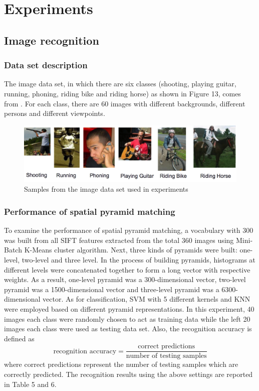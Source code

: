 \section{Experiments}
\subsection{Image recognition}
\subsubsection{Data set description}
The image data set, in which there are six classes (shooting, playing guitar, running, phoning, riding bike and riding horse) as shown in Figure 13, comes from \cite{li2011actions}. For each class, there are 60 images with different backgrounds, different persons and different viewpoints. 

\begin{figure}[!ht]
\centering
  \includegraphics[width=1\textwidth]{./imageSet.png}
\caption{Samples from the image data set used in experiments \cite{li2011actions}}
\end{figure}

\subsubsection{Performance of spatial pyramid matching}
To examine the performance of spatial pyramid matching, a vocabulary with 300 was built from all SIFT features extracted from the total 360 images using Mini-Batch K-Means cluster algorithm. Next, three kinds of pyramids were built: one-level, two-level and three level. In the process of building pyramids, histograms at different levels were concatenated together to form a long vector with respective weights. As a result, one-level pyramid was a 300-dimensional vector, two-level pyramid was a 1500-dimensional vector and three-level pyramid was a 6300-dimensional vector. As for classification, SVM with 5 different kernels and KNN were employed based on different pyramid representations. In this experiment, 40 images each class were randomly chosen to act as training data while the left 20 images each class were used as testing data set. Also, the recognition accuracy is defined as 
\begin{equation}
\text{recognition accuracy} = \frac{\text{correct predictions}}{\text{number of testing samples}}
\end{equation}
where correct predictions represent the number of testing samples which are correctly predicted. The recognition results using the above settings are reported in Table 5 and 6. \\

